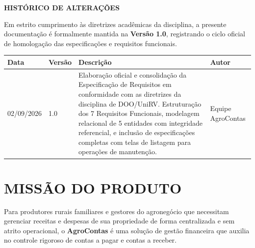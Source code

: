\documentclass[
	12pt,
	oneside,
	a4paper,
	brazilian
]{abntex2}
\begin{document}
\frenchspacing

\imprimircapa
\imprimirfolhaderosto

\clearpage
\begin{center}
	{\Large\bfseries HISTÓRICO DE ALTERAÇÕES}
\end{center}
\vspace{1cm}

\noindent Em estrito cumprimento às diretrizes acadêmicas da disciplina, a presente documentação é formalmente mantida na \textbf{Versão 1.0}, registrando o ciclo oficial de homologação das especificações e requisitos funcionais.

\vspace{0.5cm}

\begin{table}[H]
	\centering
	\small
	\begin{tabularx}{\textwidth}{p{2.5cm} p{2cm} p{6.5cm} X}
		\toprule
		\textbf{Data} & \textbf{Versão} & \textbf{Descrição} & \textbf{Autor} \\
		\midrule
		02/09/2026 & 1.0 & Elaboração oficial e consolidação da Especificação de Requisitos em conformidade com as diretrizes da disciplina de DOO/UniRV. Estruturação dos 7 Requisitos Funcionais, modelagem relacional de 5 entidades com integridade referencial, e inclusão de especificações completas com telas de listagem para operações de manutenção. & Equipe AgroContas \\
		\bottomrule
	\end{tabularx}
\end{table}

\clearpage
\tableofcontents*

\clearpage
\textual

\chapter{MISSÃO DO PRODUTO}

Para produtores rurais familiares e gestores do agronegócio que necessitam gerenciar receitas e despesas de sua propriedade de forma centralizada e sem atrito operacional, o \textbf{AgroContas} é uma solução de gestão financeira que auxilia no controle rigoroso de contas a pagar e contas a receber. 
\end{document}
